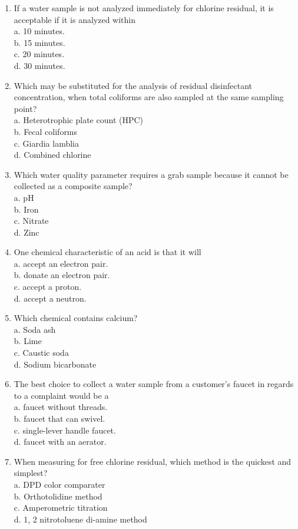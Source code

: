 \documentclass[10pt]{article}
\begin{document}
\begin{enumerate}
  \item If a water sample is not analyzed immediately for chlorine residual, it is acceptable if it is analyzed within\\
a. 10 minutes.\\
b. 15 minutes.\\
c. 20 minutes.\\
d. 30 minutes.

  \item Which may be substituted for the analysis of residual disinfectant concentration, when total coliforms are also sampled at the same sampling point?\\
a. Heterotrophic plate count (HPC)\\
b. Fecal coliforms\\
c. Giardia lamblia\\
d. Combined chlorine

  \item Which water quality parameter requires a grab sample because it cannot be collected as a composite sample?\\
a. $\mathrm{pH}$\\
b. Iron\\
c. Nitrate\\
d. Zinc 

	\item One chemical characteristic of an acid is that it will\\
a. accept an electron pair.\\
b. donate an electron pair.\\
c. accept a proton.\\
d. accept a neutron.

  \item Which chemical contains calcium?\\
a. Soda ash\\
b. Lime\\
c. Caustic soda\\
d. Sodium bicarbonate

  \item The best choice to collect a water sample from a customer's faucet in regards to a complaint would be a\\
a. faucet without threads.\\
b. faucet that can swivel.\\
c. single-lever handle faucet.\\
d. faucet with an aerator.

  \item When measuring for free chlorine residual, which method is the quickest and simplest?\\
a. DPD color comparater\\
b. Orthotolidine method\\
c. Amperometric titration\\
d. 1, 2 nitrotoluene di-amine method


\end{enumerate}
\end{document}
